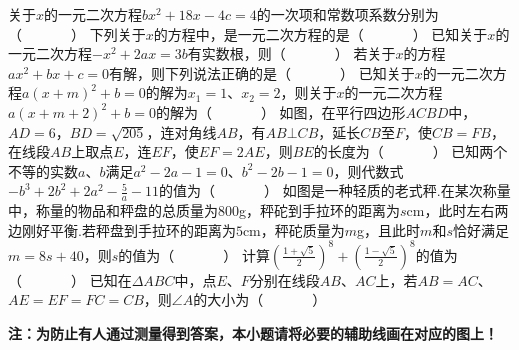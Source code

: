 \documentclass[10pt]{article}
\begin{document}
\showsecret
{}
\informationline
\begin{questions}{\selectingintroduction}
    \question 关于$x$的一元二次方程$bx^{2} + 18x - 4c = 4$的一次项和常数项系数分别为（~~~~~~~）
    \question 下列关于$x$的方程中，是一元二次方程的是（~~~~~~~）
    \question 已知关于$x$的一元二次方程$- x^{2} + 2ax = 3b$有实数根，则（~~~~~~~）
    \question 若关于$x$的方程$ax^{2} + bx + c = 0$有解，则下列说法正确的是（~~~~~~~）
    \question 已知关于$x$的一元二次方程$a(x+m)^2+b=0$的解为$x_{1} = 1$、$x_{2} = 2$，则关于$x$的一元二次方程$a(x+m+2)^2+b=0$的解为（~~~~~~~）
    \question 如图，在平行四边形$ACBD$中，$AD=6$，$BD=\sqrt{205}$，连对角线$AB$，有$AB \bot CB$，延长$CB$至$F$，使$CB=FB$，在线段$AB$上取点$E$，连$EF$，使$EF=2AE$，则$BE$的长度为（~~~~~~~）
    \question 已知两个不等的实数$a$、$b$满足$a^2-2a-1=0$、$b^2-2b-1=0$，则代数式$-b^3+2b^2+2a^2-\frac{5}{a}-11$的值为（~~~~~~~）
    \question 如图是一种轻质的老式秤.在某次称量中，称量的物品和秤盘的总质量为$800$g，秤砣到手拉环的距离为$s$cm，此时左右两边刚好平衡.若秤盘到手拉环的距离为$5$cm，秤砣质量为$m$g，且此时$m$和$s$恰好满足$m=8s+40$，则$s$的值为（~~~~~~~）
    \question 计算${\left(\frac{1+\sqrt{5}}{2}\right)^8+\left(\frac{1-\sqrt{5}}{2}\right)^8}$的值为（~~~~~~~）
    \question 已知在$\Delta ABC$中，点$E$、$F$分别在线段$AB$、$AC$上，若$AB = AC$、$AE = EF = FC = CB$，则$\angle A$的大小为（~~~~~~~）
    \par
    \textbf{注：为防止有人通过测量得到答案，本小题请将必要的辅助线画在对应的图上！}
    \begin{figure}[!ht]
        \centering
\end{figure}
\end{questions}
\end{document}
